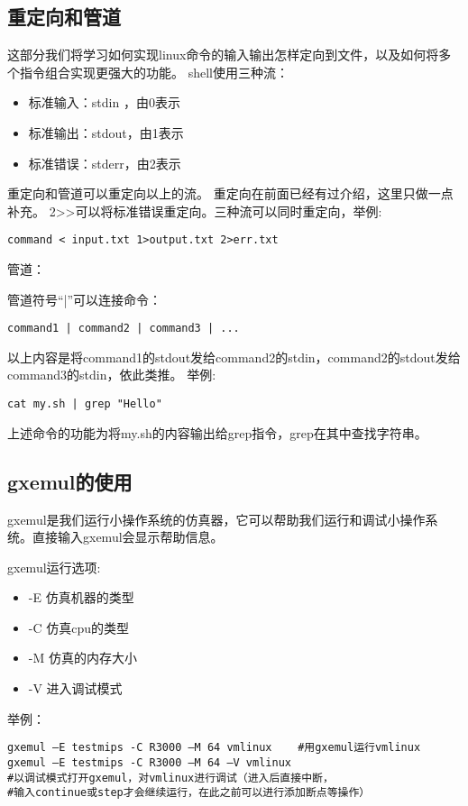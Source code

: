 \subsection{重定向和管道}
这部分我们将学习如何实现linux命令的输入输出怎样定向到文件，以及如何将多个指令组合实现更强大的功能。
shell使用三种流：
\begin{itemize}
\item 标准输入：stdin ，由0表示
\item 标准输出：stdout，由1表示
\item 标准错误：stderr，由2表示
\end{itemize}
重定向和管道可以重定向以上的流。
重定向在前面已经有过介绍，这里只做一点补充。
2>>可以将标准错误重定向。三种流可以同时重定向，举例:
\begin{verbatim}
command < input.txt 1>output.txt 2>err.txt
\end{verbatim}
管道：

管道符号“|”可以连接命令：
\begin{verbatim}
command1 | command2 | command3 | ...
\end{verbatim}
以上内容是将command1的stdout发给command2的stdin，command2的stdout发给command3的stdin，依此类推。
举例:
\begin{verbatim}
cat my.sh | grep "Hello"
\end{verbatim}
上述命令的功能为将my.sh的内容输出给grep指令，grep在其中查找字符串。

\subsection{gxemul的使用}
gxemul是我们运行小操作系统的仿真器，它可以帮助我们运行和调试小操作系统。直接输入gxemul会显示帮助信息。

gxemul运行选项:
\begin{itemize}
\item -E 仿真机器的类型
\item -C 仿真cpu的类型
\item -M 仿真的内存大小
\item -V 进入调试模式
\end{itemize}
举例：
\begin{verbatim}
gxemul –E testmips -C R3000 –M 64 vmlinux    #用gxemul运行vmlinux
gxemul –E testmips -C R3000 –M 64 –V vmlinux
#以调试模式打开gxemul，对vmlinux进行调试（进入后直接中断，
#输入continue或step才会继续运行，在此之前可以进行添加断点等操作）
\end{verbatim}

